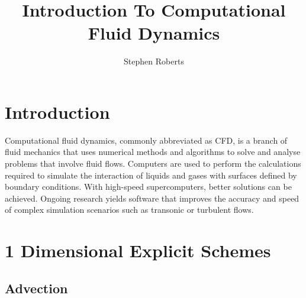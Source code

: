 \documentclass[12pt]{article}
\title{Introduction To Computational Fluid Dynamics}
\author{Stephen Roberts}
\begin{document}
\maketitle

\section{Introduction}
Computational fluid dynamics, commonly abbreviated as CFD, is a branch of fluid mechanics that uses numerical methods and algorithms to solve and analyse problems that involve fluid flows. Computers are used to perform the calculations required to simulate the interaction of liquids and gases with surfaces defined by boundary conditions. With high-speed supercomputers, better solutions can be achieved. Ongoing research yields software that improves the accuracy and speed of complex simulation scenarios such as transonic or turbulent flows.

\section{1 Dimensional Explicit Schemes}

\subsection{Advection}
\end{document}
